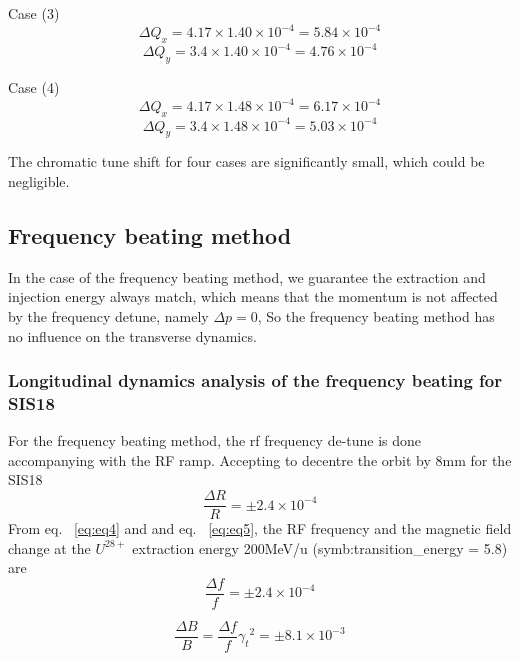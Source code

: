 Case (3)
\begin{equation}
\Delta Q_x = 4.17 \times 1.40 \times 10^{-4}=5.84 \times 10^{-4}
\end{equation}
\begin{equation}
\Delta Q_y = 3.4 \times 1.40 \times 10^{-4}=4.76 \times 10^{-4} 
\end{equation}

Case (4) 
\begin{equation}
\Delta Q_x = 4.17 \times 1.48 \times 10^{-4}=6.17 \times 10^{-4}
\end{equation}
\begin{equation}
\Delta Q_y = 3.4 \times 1.48 \times 10^{-4}=5.03 \times 10^{-4} 
\end{equation}

The chromatic tune shift for four cases are significantly small, which could be negligible.
\subsection{Frequency beating method}
In the case of the frequency beating method, we guarantee the extraction and injection energy always match, which means that the momentum is not affected by the frequency detune, namely $\Delta p = 0$, So the frequency beating method has no influence on the transverse dynamics.

\subsubsection{Longitudinal dynamics analysis of the frequency beating for SIS18}
For the frequency beating method, the rf frequency de-tune is done accompanying with
the RF ramp. Accepting to decentre the orbit by 8mm for the SIS18 
\begin{equation}
\frac{\Delta{R}}{R} = \pm 2.4 \times 10^{-4}
\end{equation}
From eq. ~\ref{eq:eq4} and and eq. ~\ref{eq:eq5}, the RF frequency and the magnetic field change at the $U^{28+}$ extraction energy 200MeV/u (\gls{symb:transition_energy} = 5.8) are
\begin{equation}
\frac{\Delta{f}}{f} = \pm 2.4 \times 10^{-4}
\end{equation}

\begin{equation}
\frac{\Delta{B}}{B}=\frac{\Delta{f}}{f}{\gamma_t}^2 = \pm 8.1 \times 10^{-3}
\end{equation}

